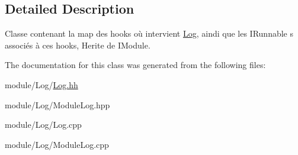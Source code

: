 \subsection{Detailed Description}
Classe contenant la map des hooks où intervient \hyperlink{class_log}{Log}, aindi que les I\+Runnable s associés à ces hooks, Herite de I\+Module. 

The documentation for this class was generated from the following files\+:\begin{DoxyCompactItemize}
\item 
module/\+Log/\hyperlink{_log_8hh}{Log.\+hh}\item 
module/\+Log/Module\+Log.\+hpp\item 
module/\+Log/Log.\+cpp\item 
module/\+Log/Module\+Log.\+cpp\end{DoxyCompactItemize}
